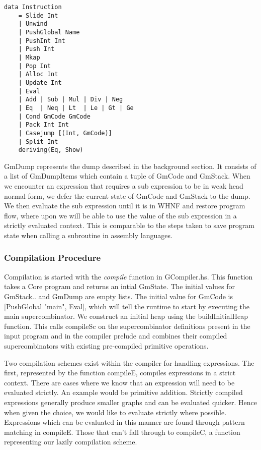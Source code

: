 \begin{verbatim}
data Instruction 
	= Slide Int 
	| Unwind
	| PushGlobal Name 
	| PushInt Int 
	| Push Int 
	| Mkap
	| Pop Int
	| Alloc Int 
	| Update Int
	| Eval
	| Add | Sub | Mul | Div | Neg
	| Eq  | Neq | Lt  | Le | Gt | Ge
	| Cond GmCode GmCode
	| Pack Int Int
	| Casejump [(Int, GmCode)]
	| Split Int
	deriving(Eq, Show)
\end{verbatim}


GmDump represents the dump described in the background section.
It consists of a list of GmDumpItems which contain a tuple of
GmCode and GmStack. When we encounter an expression that 
requires a sub expression to be in weak head normal form, we
defer the current state of GmCode and GmStack to the dump.
We then evaluate the sub expression until it is in WHNF and restore
program flow, where upon we will be able to use the value of the
sub expression in a strictly evaluated context. This is 
comparable to the steps taken to save program state when
calling a subroutine in assembly languages. 

\subsubsection{Compilation Procedure}
Compilation is started with the \emph{compile} function in 
GCompiler.hs. This function takes a Core program and 
returns an intial GmState. The initial values for GmStack..
and GmDump are empty lists. The initial value for GmCode
is [PushGlobal "main", Eval], which will tell the runtime
to start by executing the main supercombinator. We construct 
an initial heap using the buildInitialHeap
function. This calls compileSc on the supercombinator definitions 
present in the input program and in the compiler prelude and combines 
their compiled supercombinators with existing pre-compiled
primitive operations. 

Two compilation schemes exist within the compiler for handling
expressions. The first, represented by the function compileE,
compiles expressions in a strict context. There are cases 
where we know that an expression will need to be evaluated
strictly. An example would be primitive addition. Strictly
compiled expressions generally produce smaller graphs and can
be evaluated quicker. Hence when given the choice, we would
like to evaluate strictly where possible. Expressions which
can be evaluated in this manner are found through pattern
matching in compileE. Those that can't fall through to
compileC, a function representing our lazily compilation
scheme. 

